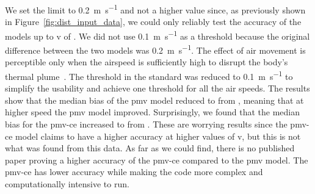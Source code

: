 We set the limit to \qty{0.2}{\m\per\s} and not a higher value since, as previously shown in Figure~\ref{fig:dist_input_data}, we could only reliably test the accuracy of the models up to \ac{v} of .
We did not use \qty{0.1}{\m\per\s} as a threshold because the original difference between the two models was \qty{0.2}{\m\per\s}.
The effect of air movement is perceptible only when the airspeed is sufficiently high to disrupt the body's thermal plume~\cite{zukowska_impact_2012}.
The threshold in the standard was reduced to \qty{0.1}{\m\per\s} to simplify the usability and achieve one threshold for all the air speeds.
The results show that the median bias of the \ac{pmv} model reduced to  from , meaning that at higher speed the \ac{pmv} model improved.
Surprisingly, we found that the median bias for the \ac{pmv-ce} increased to  from .
These are worrying results since the \ac{pmv-ce} model claims to have a higher accuracy at higher values of \ac{v}, but this is not what was found from this data.
As far as we could find, there is no published paper proving a higher accuracy of the \ac{pmv-ce} compared to the \ac{pmv} model. 
The \ac{pmv-ce} has lower accuracy while making the code more complex and computationally intensive to run.

